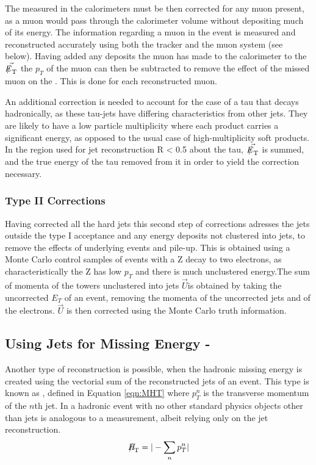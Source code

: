 The \met measured in the calorimeters must be then corrected for any muon present, as a muon would pass through the calorimeter volume without depositing much of its energy. The information regarding a muon in the event is measured and reconstructed accurately using both the tracker and the muon system (see below). Having added any deposits the muon has made to the calorimeter to the $\vec{\met}$ the $p_{T}$ of the muon can then be subtracted to remove the effect of the missed muon on the \met. This is done for each reconstructed muon. 

An additional correction is needed to account for the case of a tau that decays hadronically, as these tau-jets have differing characteristics from other jets. They are likely to have a low particle multiplicity where each product carries a significant energy, as opposed to the usual case of high-multiplicity soft products. In the region used for jet reconstruction R < 0.5 about the tau, $\vec{\met}$ is summed, and the true energy of the tau removed from it in order to yield the correction necessary.  

\subsubsection{Type II Corrections}

Having corrected all the hard jets this second step of corrections adresses the jets outside the type I acceptance and any energy deposits not clustered into jets, to remove the effects of underlying events and pile-up. This is obtained using a Monte Carlo control samples of events with a Z decay to two electrons, as characteristically the Z has low $p_{T}$ and there is much unclustered energy.The sum of momenta of the towers unclustered into jets $\vec{U}$is obtained by taking the uncorrected $E_{T}$ of an event, removing the momenta of the uncorrected jets and of the electrons. $\vec{U}$ is then corrected using the Monte Carlo truth information. 


\subsection{Using Jets for Missing Energy - \MHT}

Another type of \met reconstruction is possible, when the hadronic missing energy is created using the vectorial sum of the reconstructed jets of an event. This type is known as \MHT, defined in Equation \ref{eqn:MHT} where $p_{T}^{n}$ is the transverse momentum of the $n$th jet.  In a hadronic event with no other standard physics objects other than jets is analogous to a \met measurement, albeit relying only on the jet reconstruction. 
\begin{equation}
\MHT = | - \sum_{n} p_{T}^{n}|
\label{eqn:mht}
\end{equation}

